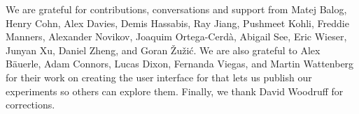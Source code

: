 We are grateful for contributions, conversations and support from Matej Balog, Henry Cohn, Alex Davies, Demis Hassabis, Ray Jiang, Pushmeet Kohli, Freddie Manners, Alexander Novikov, Joaquim Ortega-Cerd\`a, Abigail See, Eric Wieser, Junyan Xu, Daniel Zheng, and Goran \v{Z}u\v{z}i\'c. We are also grateful to Alex B\"auerle, Adam Connors, Lucas Dixon, Fernanda Viegas, and Martin Wattenberg for their work on creating the user interface for \AlphaEvolve that lets us publish our experiments so others can explore them.  Finally, we thank David Woodruff for corrections.


%
